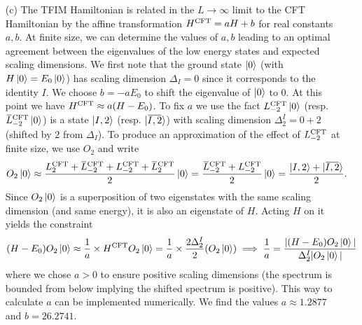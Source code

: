 \documentclass[10pt, a4paper]{article}
\begin{document}
{\begin{enumerate}
  \item[(c)] The TFIM Hamiltonian is related in the $L\to \infty$ limit to the CFT Hamiltonian by the affine transformation $H^{\rm CFT} = a H  + b$ for real constants $a, b$. At finite size, we can determine the values of $a, b$ leading to an optimal agreement between the eigenvalues of the low energy states and expected scaling dimensions. We first note that the ground state $\ket{0}$ (with $H \ket{0} = E_0 \ket{0}$) has scaling dimension $\Delta_I = 0$ since it corresponds to the identity $I$. We choose $b = -a E_0$ to shift the eigenvalue of $\ket{0}$ to $0$. At this point we have $H^{\rm CFT} \approx a (H  - E_0)$. To fix $a$ we use the fact $L^{\rm CFT}_{-2} \ket{0}$ (resp. $\bar{L}^{\rm CFT}_{-2} \ket{0}$) is a state $\ket{I, 2}$ (resp. $\ket{\bar{I, 2}}$) with scaling dimension $\Delta_{2}^{I} = 0 + 2$ (shifted by $2$ from $\Delta_I$). To produce an approximation of the effect of $L_{-2}^{\rm CFT}$ at finite size, we use $O_2$ and write 
  \begin{align*}
    O_2 \ket{0} \approx \frac{L_2^{\rm C F T}+\bar{L}_{-2}^{\rm C F T}+L_{-2}^{\rm C F T}+\bar{L}_2^{\rm C F T}}{2} \ket{0} = \frac{\bar{L}_{-2}^{\rm C F T}+L_{-2}^{\rm C F T}}{2} \ket{0} = \frac{\ket{I, 2} + \ket{\bar{I, 2}}}{2}.
  \end{align*}
  Since $O_2 \ket{0}$ is a superposition of two eigenstates with the same scaling dimension (and same energy), it is also an eigenstate of $H$. Acting $H$ on it yields the constraint 
  \begin{align*}
    (H - E_0) O_2 \ket{0} \approx \frac{1}{a} \times H^{\rm CFT} O_2 \ket{0} = \frac{1}{a} \times \frac{2\Delta_2^I}{2}(O_2 \ket{0}) \implies \frac{1}{a} = \frac{|(H - E_0) O_2 \ket{0}|}{\Delta_2^I|O_2 \ket{0}|}
  \end{align*}
  where we chose $a > 0$ to ensure positive scaling dimensions (the spectrum is bounded from below implying the shifted spectrum is positive). This way to calculate $a$ can be implemented numerically. We find the values $a \approx 1.2877$ and $b = 26.2741$. 
  

\end{enumerate}}
\end{document}
